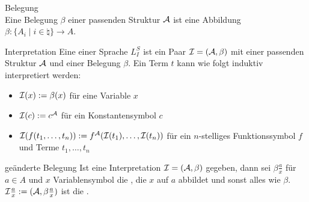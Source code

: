 \begin{Def}{Belegung}\\
    Eine Belegung $\beta$ einer passenden Struktur $\mathcal{A}$ ist eine Abbildung
    $\beta\colon \{A_i \;|\; i \in \natural\} \rightarrow A$.
\end{Def}

\begin{Def}{Interpretation}
    Eine  einer Sprache $L_I^S$ ist ein Paar $\mathcal{I} = (\mathcal{A}, \beta)$
    mit einer passenden Struktur $\mathcal{A}$ und einer Belegung $\beta$.
    Ein Term $t$ kann wie folgt induktiv interpretiert werden:
    \begin{itemize}
        \item
        $\mathcal{I}(x) := \beta(x)$ für eine Variable $x$

        \item
        $\mathcal{I}(c) := c^{\mathcal{A}}$ für ein Konstantensymbol $c$

        \item
        $\mathcal{I}(f(t_1, \dotsc, t_n)) := f^{\mathcal{A}}(\mathcal{I}(t_1), \dotsc, \mathcal{I}(t_n))$
        für ein $n$-stelliges Funktionssymbol $f$ und Terme $t_1, \dotsc, t_n$
    \end{itemize}
\end{Def}

\begin{Def}{geänderte Belegung}
    Ist eine Interpretation $\mathcal{I} = (\mathcal{A}, \beta)$ gegeben,
    dann sei $\beta \frac{a}{x}$ für $a \in A$ und $x$ Variablensymbol die
    ,
    die $x$ auf $a$ abbildet und sonst alles wie $\beta$.
    $\mathcal{I} \frac{a}{x} := (\mathcal{A}, \beta \frac{a}{x})$ ist die .
\end{Def}

\linie

